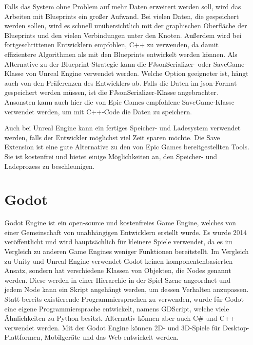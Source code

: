 Falls das System ohne Problem auf mehr Daten erweitert werden soll, wird das Arbeiten mit Blueprints ein großer Aufwand. Bei vielen Daten, die gespeichert werden sollen, wird es schnell unübersichtlich mit der graphischen Oberfläche der Blueprints und den vielen Verbindungen unter den Knoten. Außerdem wird bei fortgeschrittenen Entwicklern empfohlen, C++ zu verwenden, da damit effizientere Algorithmen als mit den Blueprints entwickelt werden können.\cite{epicgamesComparingBlueprints} Als Alternative zu der Blueprint-Strategie kann die FJsonSerializer- oder SaveGame-Klasse von Unreal Engine verwendet werden. Welche Option geeigneter ist, hängt auch von den Präferenzen des Entwicklers ab. Falls die Daten im \ac{json}-Format gespeichert werden müssen, ist die FJsonSerializer-Klasse angebrachter. Ansonsten kann auch hier die von Epic Games empfohlene SaveGame-Klasse verwendet werden, um mit C++-Code die Daten zu speichern.

Auch bei Unreal Engine kann ein fertiges Speicher- und Ladesystem verwendet werden, falls der Entwickler möglichst viel Zeit sparen möchte. Die Save Extension ist eine gute Alternative zu den von Epic Games bereitgestellten Tools. Sie ist kostenfrei und bietet einige Möglichkeiten an, den Speicher- und Ladeprozess zu beschleunigen. 



\section{Godot}
Godot Engine ist ein open-source und kostenfreies Game Engine, welches von einer Gemeinschaft von unabhängigen Entwicklern erstellt wurde. Es wurde 2014 veröffentlicht und wird hauptsächlich für kleinere Spiele verwendet, da es im Vergleich zu anderen Game Engines weniger Funktionen bereitstellt. Im Vergleich zu Unity und Unreal Engine verwendet Godot keinen komponentenbasierten Ansatz, sondern hat verschiedene Klassen von Objekten, die Nodes genannt werden. Diese werden in einer Hierarchie in der Spiel-Szene angeordnet und jedem Node kann ein Skript angehängt werden, um dessen Verhalten anzupassen. Statt bereits existierende Programmiersprachen zu verwenden, wurde für Godot eine eigene Programmiersprache entwickelt, namens GDScript, welche viele Ähnlichkeiten zu Python besitzt. Alternativ können aber auch C\# und C++ verwendet werden. Mit der Godot Engine können 2D- und 3D-Spiele für Desktop-Plattformen, Mobilgeräte und das Web entwickelt werden.\cite{salmela2022game}

